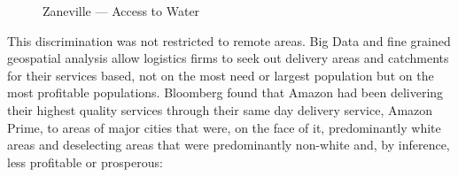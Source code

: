 \begin{figure}[ht]
\hfill
{}
\caption{Zaneville --- Access to Water\cite{RefWorks:82}}
\end{figure}



This discrimination was not restricted to remote areas. Big Data and fine grained geospatial analysis allow logistics firms to seek out delivery areas and catchments for their services based, not on the most need or largest population but on the most profitable populations. Bloomberg found that Amazon had been delivering their highest quality services through their same day delivery service, Amazon Prime, to areas of major cities that were, on the face of it, predominantly white areas and deselecting areas that were predominantly non-white and, by inference, less profitable or prosperous:



